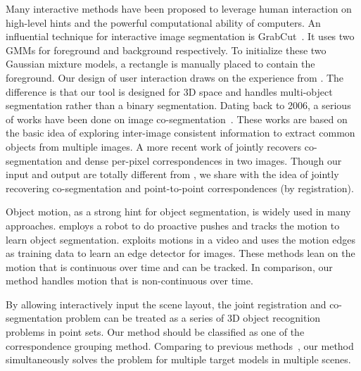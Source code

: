 \noindent Many interactive methods have been proposed to leverage human interaction on high-level hints and the powerful computational ability of computers.
%
An influential technique for interactive image segmentation is GrabCut~\cite{grabcut}. 
It uses two GMMs for foreground and background respectively. 
To initialize these two Gaussian mixture models, a rectangle is manually placed to contain the foreground. 
Our design of user interaction draws on the experience from \cite{grabcut}. 
%
The difference is that our tool is designed for 3D space and handles multi-object segmentation rather than a binary segmentation. 
%
Dating back to 2006, a serious of works have been done on image co-segmentation~\cite{COSEG}.
These works are based on the basic idea of exploring inter-image consistent information to extract common objects from multiple images.
%
A more recent work of \cite{Taniai_2016_CVPR} jointly recovers co-segmentation and dense per-pixel correspondences in two images. 
Though our input and output are totally different from \cite{Taniai_2016_CVPR}, we share with \cite{Taniai_2016_CVPR} the idea of jointly recovering co-segmentation and point-to-point correspondences (by registration).

Object motion, as a strong hint for object segmentation, is widely used in many approaches.
\cite{Xu:2015:ACS:2816795.2818075} employs a robot to do proactive pushes and tracks the motion to learn object segmentation. 
\cite{unsupervisededge} exploits motions in a video and uses the motion edges as training data to learn an edge detector for images.
These methods lean on the motion that is continuous over time and can be tracked. 
In comparison, our method handles motion that is non-continuous over time.

By allowing interactively input the scene layout, the joint registration and co-segmentation problem can be treated as a series of 3D object recognition problems in point sets. 
%
Our method should be classified as one of the correspondence grouping method. 
Comparing to previous methods~\cite{hough,LOF}, our method simultaneously solves the problem for multiple target models in multiple scenes.
